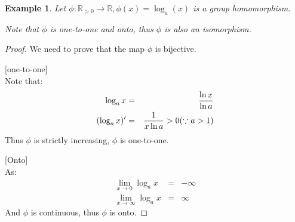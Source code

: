 \documentclass{article}
\theoremstyle{MyNonumberplain}
\theoremstyle{break}
\newtheorem*{proof}{Proof. }
\newcommand{\p}{\phi}
\theoremstyle{break}
\newtheorem{example}{Example}[section]
\theoremstyle{break}
\theoremstyle{definition}
\theoremstyle{break}
\begin{document}
\begin{expbox}
    \begin{example}
        Let $\p : \mathbb{R}_{> 0} \rightarrow \mathbb{R}, \p (x) = \log_a (x)$ is a
        group homomorphism.\bigskip

        Note that $\p$ is one-to-one and onto, thus $\p$ is also an isomorphism. 
    \end{example}
    \begin{prfbox}
        \begin{proof}
            We need to prove that the map $\p$ is bijective.\bigskip

            [one-to-one]\\

            Note that:
            \begin{eqnarray*}
            \log_a x & = & \frac{\ln x}{\ln a}\\
            (\log_a x)' & = & \frac{1}{x \ln a} > 0 \hspace*{\fill} (\because a > 1)
            \end{eqnarray*}
            Thus $\p$ is strictly increasing, $\p$ is one-to-one.\bigskip

            [Onto]\\

            As:
            \begin{eqnarray*}
            \lim_{x \rightarrow 0} \log_a x & = & - \infty\\
            \lim_{x \rightarrow \infty} \log_a x & = & \infty
            \end{eqnarray*}
            And $\p$ is continuous, thus $\p$ is onto.
        \end{proof}
    \end{prfbox}
\end{expbox}
\end{document}
